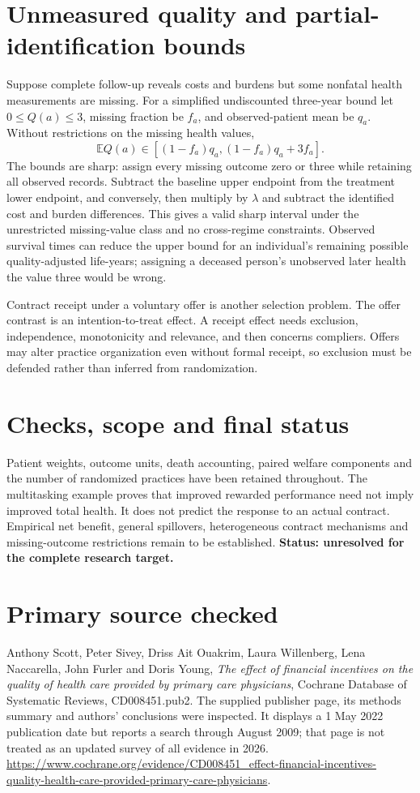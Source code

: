 \documentclass[11pt]{article}
\newcommand{\E}{\mathbb E}
\begin{document}
\section*{Unmeasured quality and partial-identification bounds}
Suppose complete follow-up reveals costs and burdens but some nonfatal health measurements are missing. For a simplified undiscounted three-year bound let $0\leq Q(a)\leq3$, missing fraction be $f_a$, and observed-patient mean be $q_a$. Without restrictions on the missing health values,
\[
 \E Q(a)\in[(1-f_a)q_a,(1-f_a)q_a+3f_a].
\]
The bounds are sharp: assign every missing outcome zero or three while retaining all observed records. Subtract the baseline upper endpoint from the treatment lower endpoint, and conversely, then multiply by $\lambda$ and subtract the identified cost and burden differences. This gives a valid sharp interval under the unrestricted missing-value class and no cross-regime constraints. Observed survival times can reduce the upper bound for an individual's remaining possible quality-adjusted life-years; assigning a deceased person's unobserved later health the value three would be wrong.

Contract receipt under a voluntary offer is another selection problem. The offer contrast is an intention-to-treat effect. A receipt effect needs exclusion, independence, monotonicity and relevance, and then concerns compliers. Offers may alter practice organization even without formal receipt, so exclusion must be defended rather than inferred from randomization.

\section*{Checks, scope and final status}
Patient weights, outcome units, death accounting, paired welfare components and the number of randomized practices have been retained throughout. The multitasking example proves that improved rewarded performance need not imply improved total health. It does not predict the response to an actual contract. Empirical net benefit, general spillovers, heterogeneous contract mechanisms and missing-outcome restrictions remain to be established. \textbf{Status: unresolved for the complete research target.}

\section*{Primary source checked}
Anthony Scott, Peter Sivey, Driss Ait Ouakrim, Laura Willenberg, Lena Naccarella, John Furler and Doris Young, \emph{The effect of financial incentives on the quality of health care provided by primary care physicians}, Cochrane Database of Systematic Reviews, CD008451.pub2. The supplied publisher page, its methods summary and authors' conclusions were inspected. It displays a 1 May 2022 publication date but reports a search through August 2009; that page is not treated as an updated survey of all evidence in 2026. \url{https://www.cochrane.org/evidence/CD008451_effect-financial-incentives-quality-health-care-provided-primary-care-physicians}.
\end{document}
